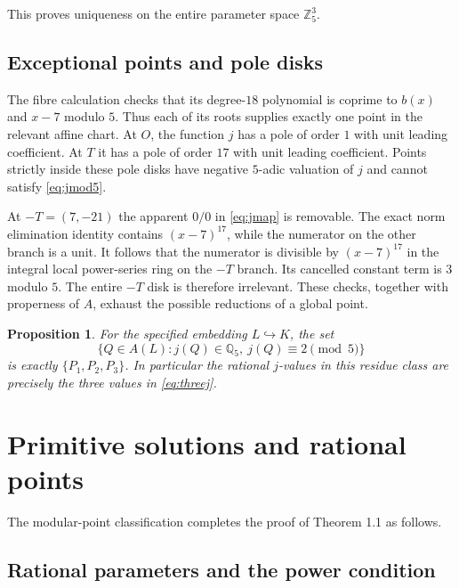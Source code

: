 \documentclass[11pt,a4paper]{article}
\newtheorem{proposition}[theorem]{Proposition}
\theoremstyle{definition}\newtheorem{definition}[theorem]{Definition}
\theoremstyle{remark}\newtheorem{remark}[theorem]{Remark}
\newcommand{\Q}{\mathbb Q}\newcommand{\Z}{\mathbb Z}\newcommand{\F}{\mathbb F}
\begin{document}
This proves uniqueness on the entire parameter space $\Z_5^3$.

\subsection{Exceptional points and pole disks}

The fibre calculation checks that its degree-$18$ polynomial is coprime
to $b(x)$ and $x-7$ modulo $5$. Thus each of its roots supplies exactly
one point in the relevant affine chart.
At $O$, the function $j$ has a pole of order $1$ with unit leading
coefficient. At $T$ it has a pole of order $17$ with unit leading
coefficient. Points strictly inside these pole disks have negative
$5$-adic valuation of $j$ and cannot satisfy \eqref{eq:jmod5}.

At $-T=(7,-21)$ the apparent $0/0$ in \eqref{eq:jmap} is removable.
The exact norm elimination identity contains $(x-7)^{17}$, while the
numerator on the other branch is a unit. It follows that the numerator
is divisible by $(x-7)^{17}$ in the integral local power-series ring on
the $-T$ branch. Its cancelled constant term is $3$ modulo $5$.
The entire $-T$ disk is therefore irrelevant. These checks, together
with properness of $A$, exhaust the possible reductions of a global
point.

\begin{proposition}\label{prop:rationalj}
For the specified embedding $L\hookrightarrow K$, the set
\[
\{Q\in A(L):j(Q)\in\Q_5,\ j(Q)\equiv2\pmod5\}
\]
is exactly $\{P_1,P_2,P_3\}$. In particular the rational $j$-values
in this residue class are precisely the three values in
\eqref{eq:threej}.
\end{proposition}

\section{Primitive solutions and rational points}\label{sec:applications}

The modular-point classification completes the proof of Theorem 1.1 as follows.

\subsection{Rational parameters and the power condition}
\end{document}
